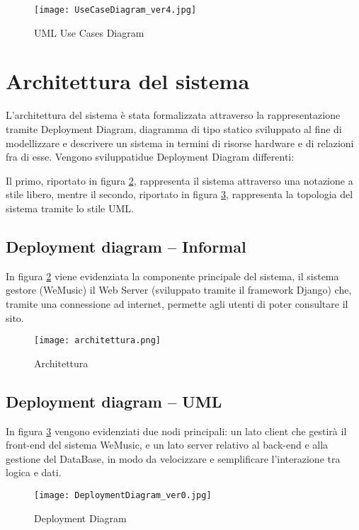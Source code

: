\begin{figure}[H]
      \centering
      \texttt{[image: UseCaseDiagram\_ver4.jpg]}
      \caption{UML Use Cases Diagram}
      \label{fig-uml-use-cases}
\end{figure}


\newpage
\section{Architettura del sistema}
L'architettura del sistema è stata formalizzata attraverso la rappresentazione tramite Deployment Diagram, diagramma di tipo statico 
sviluppato al fine di modellizzare e descrivere un sistema in termini di risorse hardware e di relazioni fra di esse.
Vengono sviluppatidue Deployment Diagram differenti:

Il primo, riportato in figura \ref{architettura}, rappresenta il sistema
attraverso una notazione a stile libero, mentre il secondo, riportato in figura \ref{dep_diagram}, rappresenta
la topologia del sistema tramite lo stile UML. 

\vspace{2cm}

\subsection{Deployment diagram -- Informal}
In figura \ref{architettura} viene evidenziata la componente principale del sistema, il sistema gestore (WeMusic)
il Web Server (sviluppato tramite il framework Django) che, tramite una connessione ad internet, permette 
agli utenti di poter consultare il sito.
\begin{figure}[H]
      \centering
      \texttt{[image: architettura.png]}
      \caption{Architettura}
      \label{architettura}
\end{figure}


\newpage
\subsection{Deployment diagram -- UML}
In figura \ref{dep_diagram} vengono evidenziati due nodi principali: 
un lato client che gestirà il front-end del sistema WeMusic, e un lato server relativo 
al back-end e alla gestione del DataBase, in modo da velocizzare e semplificare l'interazione tra logica e dati. 
\begin{figure}[H]
    \centering
    \texttt{[image: DeploymentDiagram\_ver0.jpg]}
    \caption{Deployment Diagram}
    \label{dep_diagram}
\end{figure}


